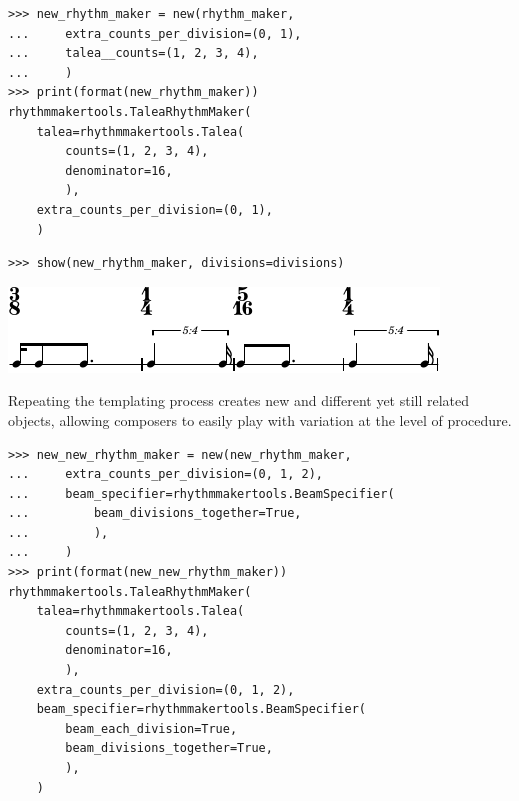 \documentclass{article}
\begin{document}
\begin{lstlisting}
>>> new_rhythm_maker = new(rhythm_maker,
...     extra_counts_per_division=(0, 1),
...     talea__counts=(1, 2, 3, 4),
...     )
>>> print(format(new_rhythm_maker))
rhythmmakertools.TaleaRhythmMaker(
    talea=rhythmmakertools.Talea(
        counts=(1, 2, 3, 4),
        denominator=16,
        ),
    extra_counts_per_division=(0, 1),
    )
\end{lstlisting}

\begin{lstlisting}
>>> show(new_rhythm_maker, divisions=divisions)
\end{lstlisting}
\includegraphics{assets/lilypond-a769357ad75c64d981f789b0e3a0f4da.pdf}

\noindent Repeating the templating process creates new and different yet still related
objects, allowing composers to easily play with variation at the level of
procedure.

\begin{lstlisting}
>>> new_new_rhythm_maker = new(new_rhythm_maker,
...     extra_counts_per_division=(0, 1, 2),
...     beam_specifier=rhythmmakertools.BeamSpecifier(
...         beam_divisions_together=True,
...         ),
...     )
>>> print(format(new_new_rhythm_maker))
rhythmmakertools.TaleaRhythmMaker(
    talea=rhythmmakertools.Talea(
        counts=(1, 2, 3, 4),
        denominator=16,
        ),
    extra_counts_per_division=(0, 1, 2),
    beam_specifier=rhythmmakertools.BeamSpecifier(
        beam_each_division=True,
        beam_divisions_together=True,
        ),
    )
\end{lstlisting}
\end{document}
